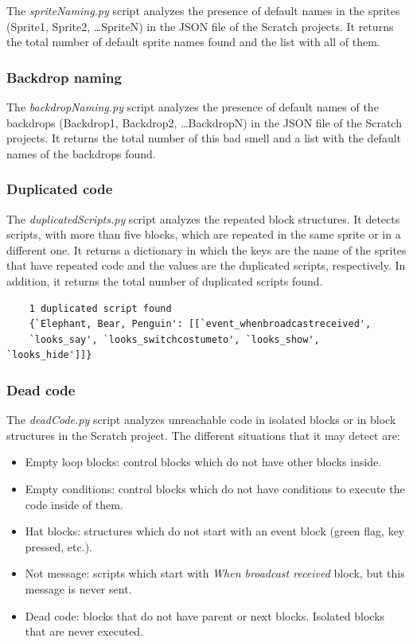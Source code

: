  The \textit{spriteNaming.py} script analyzes the presence of default names in the sprites (Sprite1, Sprite2, \ldots SpriteN) in the JSON file of the Scratch projects. It returns the total number of default sprite names found and the list with all of them.

\subsubsection{Backdrop naming}
\label{subsubsec:backdrop_naming}

The \textit{backdropNaming.py} script analyzes the presence of default names of the backdrops (Backdrop1, Backdrop2, \ldots BackdropN) in the JSON file of the Scratch projects. It returns the total number of this bad smell and a list with the default names of the backdrops found.

\subsubsection{Duplicated code}
\label{subsubsec:dup_code}

The \textit{duplicatedScripts.py} script analyzes the repeated block structures. It detects scripts, with more than five blocks, which are repeated in the same sprite or in a different one. It returns a dictionary in which the keys are the name of the sprites that have repeated code and the values are the duplicated scripts, respectively. In addition, it returns the total number of duplicated scripts found.

{\footnotesize
\begin{verbatim}
    1 duplicated script found
    {`Elephant, Bear, Penguin': [[`event_whenbroadcastreceived',
    `looks_say', `looks_switchcostumeto', `looks_show', `looks_hide']]}
\end{verbatim}
}

\subsubsection{Dead code}
\label{subsubsec:dead_code}

The \textit{deadCode.py} script analyzes unreachable code in isolated blocks or in block structures in the Scratch project. The different situations that it may detect are:

\begin{itemize}
    \item Empty loop blocks: control blocks which do not have other blocks inside. 
    \item Empty conditions: control blocks which do not have conditions to execute the code inside of them.
    \item Hat blocks: structures which do not start with an event block (green flag, key pressed, etc.).
    \item Not message: scripts which start with \textit{When broadcast received} block, but this message is never sent. 
    \item Dead code: blocks that do not have parent or next blocks. Isolated blocks that are never executed.
\end{itemize}

